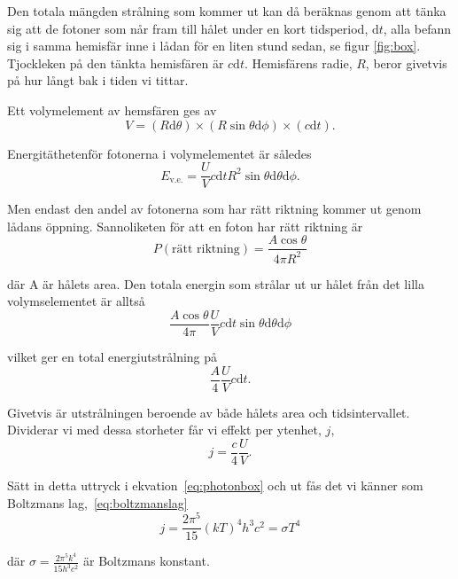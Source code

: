 Den totala mängden strålning som kommer ut kan då beräknas genom att tänka sig att 
de fotoner som når fram till hålet under en kort tidsperiod, $\mathrm{d}t$, alla befann sig
 i samma hemisfär inne i lådan för en liten stund sedan, se figur \ref{fig:box}. Tjockleken 
 på den tänkta hemisfären är $c\mathrm{d}t$. Hemisfärens radie, $R$, beror givetvis på 
 hur långt bak i tiden vi tittar.

Ett volymelement av hemsfären ges av
\begin{equation}
V=(R\mathrm{d}\theta) \times (R\sin\theta\mathrm{d}\phi) \times (c \mathrm{d}t).
\end{equation}

Energitäthetenför fotonerna i volymelementet är således
\begin{equation}
E_\text{v.e.}=\frac{U}{V} c \mathrm{d}t R^2 \sin\theta \mathrm{d}\theta \mathrm{d}\phi.
\end{equation}

Men endast den andel av fotonerna som har rätt riktning kommer ut genom lådans öppning. Sannoliketen för att en foton har rätt riktning är
\begin{equation}
P(\text{rätt riktning})=\frac{A\cos\theta}{4\pi R^2}
\end{equation}

där A är hålets area. Den totala energin som strålar ut ur hålet från det lilla 
volymselementet är alltså 
\begin{equation}
\frac{A\cos\theta}{4\pi}\frac{U}{V} c\mathrm{d}t \sin\theta\mathrm{d}\theta \mathrm{d}\phi
\end{equation}

vilket ger en total energiutstrålning på
\begin{equation}
\frac{A}{4}\frac{U}{V}c \mathrm{d}t.
\end{equation}

Givetvis är utstrålningen beroende av både hålets area och tidsintervallet. Dividerar vi med dessa storheter får vi effekt per ytenhet, $j$,
\begin{equation}
j=\frac{c}{4}\frac{U}{V}. 
\end{equation}

Sätt in detta uttryck i ekvation~\eqref{eq:photonbox} och ut fås det vi känner som Boltzmans lag,~\eqref{eq:boltzmanslag}
\begin{equation}
j=\frac{2\pi^5}{15}{(kT)^4}{h^3c^2}=\sigma T^4
\end{equation}

där $\sigma=\frac{2\pi^5k^4}{15h^3c^2}$ är Boltzmans konstant.


